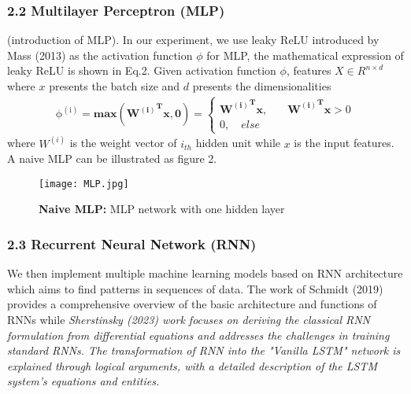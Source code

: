 \documentclass[10pt,letterpaper]{article}
\begin{document}
\subsubsection*{2.2 Multilayer Perceptron (MLP)}

(introduction of MLP).
In our experiment, we use leaky ReLU introduced by Mass (2013) as the activation function \(\phi\) for MLP, the mathematical expression of leaky ReLU  is shown in Eq.2. Given activation function \(\phi\), features \(X \in R^ {n\times d}\) where \(x\) presents the batch size and \(d\) presents the dimensionalities
\begin{eqnarray}
\label{eq:schemeP}
\mathrm{\phi^{(i)}} =\mathbf{max({W^{(i)}}^{T}x,0)}=
\begin{cases}
\mathbf{{W^{(i)}}^{T}x},\quad &\mathbf{{W^{(i)}}^{T}x}>0\\0, \quad else
\end{cases}
\end{eqnarray}
where \(W^{(i)}\) is the weight vector of \(i_{th}\) hidden unit while \(x\) is the input features. A naive MLP can be illustrated as figure 2.
\begin{figure}[!h]
\texttt{[image: MLP.jpg]}
\caption{{\bf Naive MLP:} MLP network with one hidden layer}
\label{fig2}
\end{figure}

\subsubsection*{2.3 Recurrent Neural Network (RNN)}
We then implement multiple machine learning models based on RNN architecture which aims to find patterns in sequences of data. The work of Schmidt (2019) provides a comprehensive overview of the basic architecture and functions of RNNs while \textit{Sherstinsky (2023) work focuses on deriving the classical RNN formulation from differential equations and addresses the challenges in training standard RNNs. The transformation of RNN into the "Vanilla LSTM" network is explained through logical arguments, with a detailed description of the LSTM system's equations and entities. }
\end{document}
